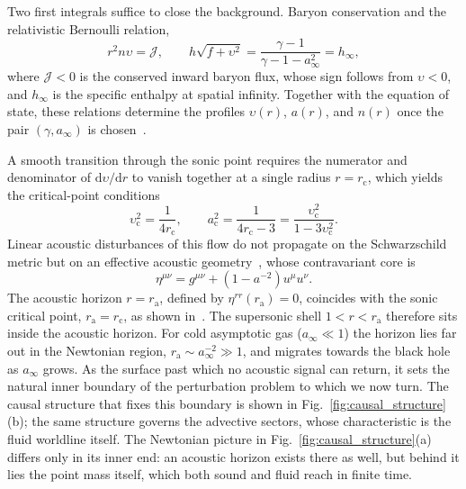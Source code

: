 \documentclass[12pt,a4paper,preprint,nopreprintline]{elsarticle}
\begin{document}
Two first integrals suffice to close the background. Baryon conservation and the relativistic Bernoulli relation,
\begin{equation}
    r^{2}n\upsilon=\mathcal{J},
    \qquad
    h\sqrt{f+\upsilon^{2}}=
    \frac{\gamma-1}{\gamma-1-a_{\infty}^{2}}=
    h_{\infty},
    \label{eq:michel_integrals}
\end{equation}
where $\mathcal{J}<0$ is the conserved inward baryon flux, whose sign follows from $\upsilon<0$, and $h_{\infty}$ is the specific enthalpy at spatial infinity. Together with the equation of state, these relations determine the profiles $\upsilon(r)$, $a(r)$, and $n(r)$ once the pair $(\gamma,a_{\infty})$ is chosen~\cite{MichelFC_AccretionOfMatterByCondensedObjects_1972}.

A smooth transition through the sonic point requires the numerator and denominator of $\mathrm{d}\upsilon/\mathrm{d}r$ to vanish together at a single radius $r=r_{\mathrm{c}}$, which yields the critical-point conditions
\begin{equation}
    \upsilon_{\mathrm{c}}^{2}=\frac{1}{4r_{\mathrm{c}}},
    \qquad
    a_{\mathrm{c}}^{2}=
    \frac{1}{4r_{\mathrm{c}}-3}=
    \frac{\upsilon_{\mathrm{c}}^{2}}{1-3\upsilon_{\mathrm{c}}^{2}}.
    \label{eq:sonic_conditions}
\end{equation}
Linear acoustic disturbances of this flow do not propagate on the Schwarzschild metric but on an effective acoustic geometry~\cite{SemyannikovAV_AcousticGeometryAndSoundRayDynamics_2026,VisserM_AcousticBlackHolesHorizonsErgospheresAndHawkingRadiation_1998,BilicN_RelativisticAcousticGeometry_1999}, whose contravariant core is
\begin{equation}
    \eta^{\mu\nu}
    =
    g^{\mu\nu}+\left(1-a^{-2}\right)u^{\mu}u^{\nu} .
    \label{eq:acoustic_core}
\end{equation}
The acoustic horizon $r=r_{\mathrm{a}}$, defined by $\eta^{rr}(r_{\mathrm{a}})=0$, coincides with the sonic critical point, $r_{\mathrm{a}}=r_{\mathrm{c}}$, as shown in~\cite{SemyannikovAV_AcousticGeometryAndSoundRayDynamics_2026}. The supersonic shell $1<r<r_{\mathrm{a}}$ therefore sits inside the acoustic horizon. For cold asymptotic gas ($a_{\infty}\ll1$) the horizon lies far out in the Newtonian region, $r_{\mathrm{a}}\sim a_{\infty}^{-2}\gg1$, and migrates towards the black hole as $a_{\infty}$ grows. As the surface past which no acoustic signal can return, it sets the natural inner boundary of the perturbation problem to which we now turn. The causal structure that fixes this boundary is shown in Fig.~\ref{fig:causal_structure}(b); the same structure governs the advective sectors, whose characteristic is the fluid worldline itself. The Newtonian picture in Fig.~\ref{fig:causal_structure}(a) differs only in its inner end: an acoustic horizon exists there as well, but behind it lies the point mass itself, which both sound and fluid reach in finite time.
\end{document}
